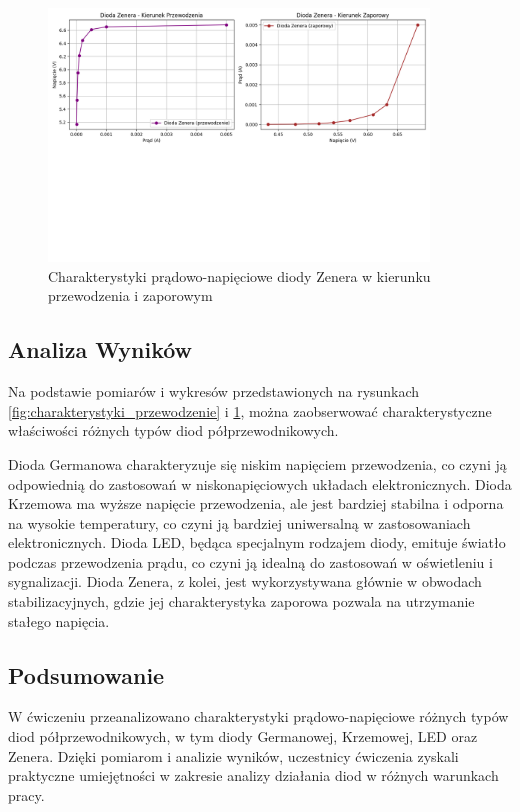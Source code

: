 \documentclass[10pt]{article}
\begin{document}
\begin{figure}[H]
    \centering
    \includegraphics[width=0.9\textwidth]{Figure_2.png}
    \caption{Charakterystyki prądowo-napięciowe diody Zenera w kierunku przewodzenia i zaporowym}
    \label{fig:charakterystyki_zaporowy}
\end{figure}
\subsection*{Analiza Wyników}
Na podstawie pomiarów i wykresów przedstawionych na rysunkach \ref{fig:charakterystyki_przewodzenie} i \ref{fig:charakterystyki_zaporowy}, można zaobserwować charakterystyczne właściwości różnych typów diod półprzewodnikowych.

Dioda Germanowa charakteryzuje się niskim napięciem przewodzenia, co czyni ją odpowiednią do zastosowań w niskonapięciowych układach elektronicznych.
Dioda Krzemowa ma wyższe napięcie przewodzenia, ale jest bardziej stabilna i odporna na wysokie temperatury, co czyni ją bardziej uniwersalną w zastosowaniach elektronicznych.
Dioda LED, będąca specjalnym rodzajem diody, emituje światło podczas przewodzenia prądu, co czyni ją idealną do zastosowań w oświetleniu i sygnalizacji.
Dioda Zenera, z kolei, jest wykorzystywana głównie w obwodach stabilizacyjnych, gdzie jej charakterystyka zaporowa pozwala na utrzymanie stałego napięcia.

\subsection*{Podsumowanie}
W ćwiczeniu przeanalizowano charakterystyki prądowo-napięciowe różnych typów diod półprzewodnikowych, w tym diody Germanowej, Krzemowej, LED oraz Zenera.
Dzięki pomiarom i analizie wyników, uczestnicy ćwiczenia zyskali praktyczne umiejętności w zakresie analizy działania diod w różnych warunkach pracy.
\end{document}
